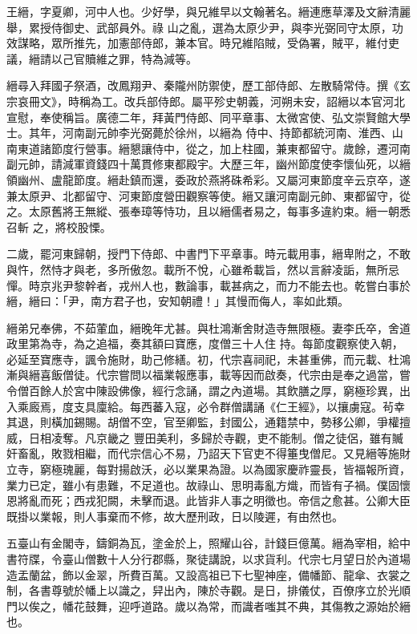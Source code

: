 \begin{pinyinscope}
 王縉，字夏卿，河中人也。少好學，與兄維早以文翰著名。縉連應草澤及文辭清麗舉，累授侍御史、武部員外。祿
 山之亂，選為太原少尹，與李光弼同守太原，功效謀略，眾所推先，加憲部侍郎，兼本官。時兄維陷賊，受偽署，賊平，維付吏議，縉請以己官贖維之罪，特為減等。



 縉尋入拜國子祭酒，改鳳翔尹、秦隴州防禦使，歷工部侍郎、左散騎常侍。撰《玄宗哀冊文》，時稱為工。改兵部侍郎。屬平殄史朝義，河朔未安，詔縉以本官河北宣慰，奉使稱旨。廣德二年，拜黃門侍郎、同平章事、太微宮使、弘文崇賢館大學士。其年，河南副元帥李光弼薨於徐州，以縉為
 侍中、持節都統河南、淮西、山南東道諸節度行營事。縉懇讓侍中，從之，加上柱國，兼東都留守。歲餘，遷河南副元帥，請減軍資錢四十萬貫修東都殿宇。大歷三年，幽州節度使李懷仙死，以縉領幽州、盧龍節度。縉赴鎮而還，委政於燕將硃希彩。又屬河東節度辛云京卒，遂兼太原尹、北都留守、河東節度營田觀察等使。縉又讓河南副元帥、東都留守，從之。太原舊將王無縱、張奉璋等恃功，且以縉儒者易之，每事多違約束。縉一朝悉召斬
 之，將校股慄。



 二歲，罷河東歸朝，授門下侍郎、中書門下平章事。時元載用事，縉卑附之，不敢與忤，然恃才與老，多所傲忽。載所不悅，心雖希載旨，然以言辭凌詬，無所忌憚。時京兆尹黎幹者，戎州人也，數論事，載甚病之，而力不能去也。乾嘗白事於縉，縉曰：「尹，南方君子也，安知朝禮！」其慢而侮人，率如此類。



 縉弟兄奉佛，不茹葷血，縉晚年尤甚。與杜鴻漸舍財造寺無限極。妻李氏卒，舍道政里第為寺，為之追福，奏其額曰寶應，度僧三十人住
 持。每節度觀察使入朝，必延至寶應寺，諷令施財，助己修繕。初，代宗喜祠祀，未甚重佛，而元載、杜鴻漸與縉喜飯僧徒。代宗嘗問以福業報應事，載等因而啟奏，代宗由是奉之過當，嘗令僧百餘人於宮中陳設佛像，經行念誦，謂之內道場。其飲膳之厚，窮極珍異，出入乘廄焉，度支具廩給。每西蕃入寇，必令群僧講誦《仁王經》，以攘虜寇。茍幸其退，則橫加錫賜。胡僧不空，官至卿監，封國公，通籍禁中，勢移公卿，爭權擅威，日相凌奪。凡京畿之
 豐田美利，多歸於寺觀，吏不能制。僧之徒侶，雖有贓奸畜亂，敗戮相繼，而代宗信心不易，乃詔天下官吏不得箠曳僧尼。又見縉等施財立寺，窮極瑰麗，每對揚啟沃，必以業果為證。以為國家慶祚靈長，皆福報所資，業力已定，雖小有患難，不足道也。故祿山、思明毒亂方熾，而皆有子禍。僕固懷恩將亂而死；西戎犯闕，未擊而退。此皆非人事之明徵也。帝信之愈甚。公卿大臣既掛以業報，則人事棄而不修，故大歷刑政，日以陵遲，有由然也。



 五臺山有金閣寺，鑄銅為瓦，塗金於上，照耀山谷，計錢巨億萬。縉為宰相，給中書符牒，令臺山僧數十人分行郡縣，聚徒講說，以求貨利。代宗七月望日於內道場造盂蘭盆，飾以金翠，所費百萬。又設高祖已下七聖神座，備幡節、龍傘、衣裳之制，各書尊號於幡上以識之，舁出內，陳於寺觀。是日，排儀仗，百僚序立於光順門以俟之，幡花鼓舞，迎呼道路。歲以為常，而識者嗤其不典，其傷教之源始於縉也。




\end{pinyinscope}
